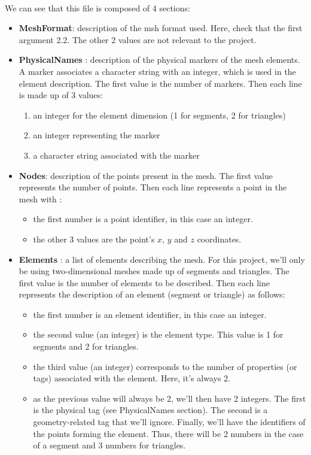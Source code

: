 \documentclass[english,10pt,a4paper]{article}
\begin{document}
\paragraph{}
We can see that this file is composed of 4 sections:
\begin{itemize}
\item \textbf{MeshFormat}: description of the msh format used. Here, check that the first argument 2.2. The other 2 values are not relevant to the project.
\item \textbf{PhysicalNames} : description of the physical markers of the mesh elements. A marker associates a character string with an integer, which is used in the element description.
  The first value is the number of markers. Then each line is made up of 3 values:
  \begin{enumerate}
  \item an integer for the element dimension (1 for segments, 2 for triangles)
  \item an integer representing the marker
  \item a character string associated with the marker
  \end{enumerate}
\item \textbf{Nodes}: description of the points present in the mesh. The first value represents the number of points.
  Then each line represents a point in the mesh with :
  \begin{itemize}
  \item the first number is a point identifier, in this case an integer.
  \item the other 3 values are the point's $x$, $y$ and $z$ coordinates. 
  \end{itemize}
\item \textbf{Elements} : a list of elements describing the mesh. For this project, we'll only be using two-dimensional meshes made up of segments and triangles.
  The first value is the number of elements to be described. Then each line represents the description of an element (segment or triangle) as follows:
  \begin{itemize}
  \item the first number is an element identifier, in this case an integer.
  \item the second value (an integer) is the element type. This value is 1 for segments and 2 for triangles.
  \item the third value (an integer) corresponds to the number of properties (or tags) associated with the element. Here, it's always 2.
  \item as the previous value will always be 2, we'll then have 2 integers. The first is the physical tag (see PhysicalNames section). The second is a geometry-related tag that we'll ignore.
  Finally, we'll have the identifiers of the points forming the element. Thus, there will be 2 numbers in the case of a segment and 3 numbers for triangles.
  \end{itemize}
\end{itemize}
\end{document}
